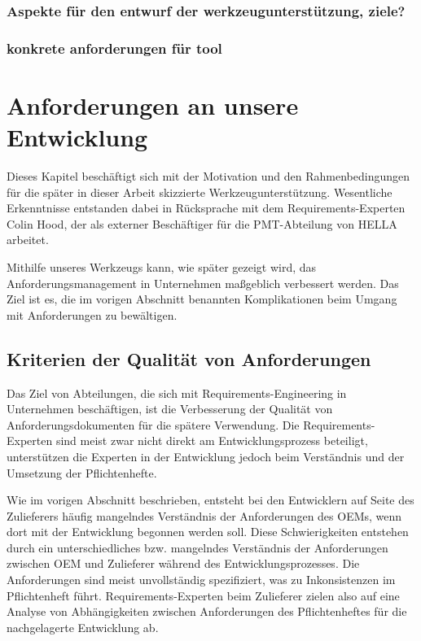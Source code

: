 \documentclass[12pt]{report}
\begin{document}
\subsubsection{Aspekte für den entwurf der werkzeugunterstützung, ziele?}
\subsubsection{konkrete anforderungen für tool}

\section{Anforderungen an unsere Entwicklung}
Dieses Kapitel beschäftigt sich mit der Motivation und den Rahmenbedingungen für die später in dieser Arbeit skizzierte Werkzeugunterstützung. Wesentliche Erkenntnisse entstanden dabei in Rücksprache mit dem Requirements-Experten Colin Hood, der als externer Beschäftiger für die PMT-Abteilung von HELLA arbeitet. 

Mithilfe unseres Werkzeugs kann, wie später gezeigt wird, das Anforderungsmanagement in Unternehmen maßgeblich verbessert werden. Das Ziel ist es, die im vorigen Abschnitt benannten Komplikationen beim Umgang mit Anforderungen zu bewältigen.

\subsection{Kriterien der Qualität von Anforderungen}
Das Ziel von Abteilungen, die sich mit Requirements-Engineering in Unternehmen beschäftigen, ist die Verbesserung der Qualität von Anforderungsdokumenten für die spätere Verwendung. Die Requirements-Experten sind meist zwar nicht direkt am Entwicklungsprozess beteiligt, unterstützen die Experten in der Entwicklung jedoch beim Verständnis und der Umsetzung der Pflichtenhefte.

Wie im vorigen Abschnitt beschrieben, entsteht bei den Entwicklern auf Seite des Zulieferers häufig mangelndes Verständnis der Anforderungen des OEMs, wenn dort mit der Entwicklung begonnen werden soll. Diese Schwierigkeiten entstehen durch ein unterschiedliches bzw. mangelndes Verständnis der Anforderungen zwischen OEM und Zulieferer während des Entwicklungsprozesses. Die Anforderungen sind meist unvollständig spezifiziert, was zu Inkonsistenzen im Pflichtenheft führt. Requirements-Experten beim Zulieferer zielen also auf eine Analyse von Abhängigkeiten zwischen Anforderungen des Pflichtenheftes für die nachgelagerte Entwicklung ab. 
\end{document}
